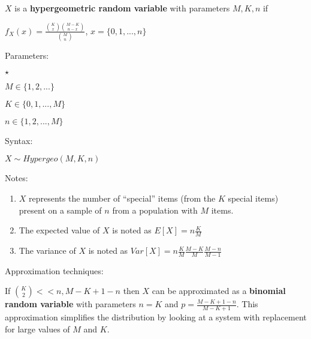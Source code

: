 \documentclass[12pt]{article}
\begin{document}
$X$ is a \textbf{hypergeometric random variable} with parameters \textbf{$M, K, n$} if\\
\par
$f_X(x) = \frac{ { K \choose x} {M-K \choose n-x} }{ {M \choose n} }$,     $x=\{0,1,...,n\}$	\\
\par
Parameters:\\
\par
\begin{list}{$\star$ }{}
\item $M \in \{1,2,...\}$
\item $K \in \{0,1,...,M\}$
\item $n \in \{1,2,...,M\}$
\end{list}
\par
Syntax:\\
\par
$X\sim Hypergeo(M,K,n)$\\
\par
Notes:\\
\par
\begin{enumerate}

\item $X$ represents the number of ``special'' items (from the $K$ special items) present on a sample of  $n$ from a population with $M$ items.
\item The expected value of $X$ is noted as $E[X] = n \frac{K}{M}$
\item The variance of $X$ is noted as $Var[X] = n \frac{K}{M} \frac{M-K}{M} \frac{M-n}{M-1}$

\end{enumerate}

Approximation techniques:

If ${K \choose 2} << n, M-K+1-n$ then $X$ can be approximated as a \textbf{binomial random variable} with parameters $n=K$ and $p=\frac{M-K+1-n}{M-K+1}$.
This approximation simplifies the distribution by looking at a system with replacement for large values of $M$ and $K$.
\end{document}
